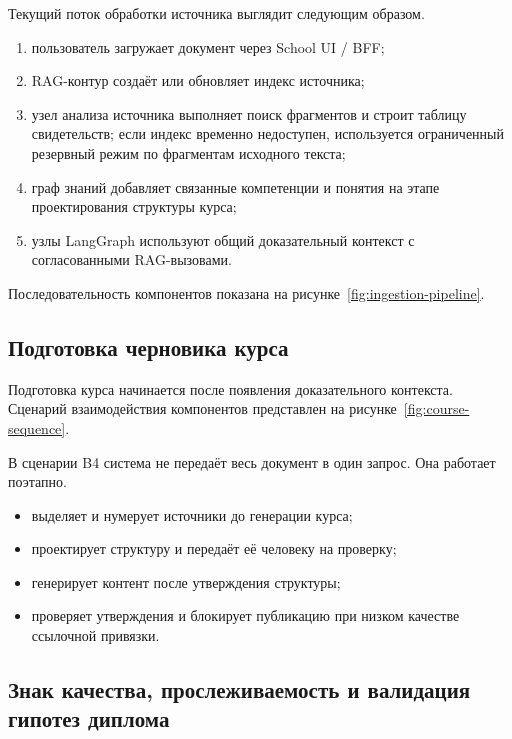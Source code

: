 Текущий поток обработки источника выглядит следующим образом.

\begin{enumerate}
  \item пользователь загружает документ через School UI / BFF;
  \item RAG-контур создаёт или обновляет индекс источника;
  \item узел анализа источника выполняет поиск фрагментов
    и строит таблицу свидетельств; если индекс временно недоступен,
    используется ограниченный резервный режим по фрагментам исходного текста;
  \item граф знаний добавляет связанные компетенции и понятия
    на этапе проектирования структуры курса;
  \item узлы LangGraph используют общий доказательный контекст
    с согласованными RAG-вызовами.
\end{enumerate}

Последовательность компонентов показана на рисунке~\ref{fig:ingestion-pipeline}.



\subsection{Подготовка черновика курса}

Подготовка курса начинается после появления доказательного контекста.
Сценарий взаимодействия компонентов представлен на
рисунке~\ref{fig:course-sequence}.



В сценарии B4 система не передаёт весь документ в один запрос. Она
работает поэтапно.

\begin{itemize}
  \item выделяет и нумерует источники до генерации курса;
  \item проектирует структуру и передаёт её человеку
    на проверку;
  \item генерирует контент после утверждения структуры;
  \item проверяет утверждения и блокирует публикацию при низком качестве
    ссылочной привязки.
\end{itemize}

\subsection[Знак качества, прослеживаемость и валидация ВКР]{Знак качества, прослеживаемость и валидация гипотез диплома}

